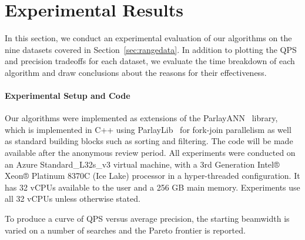 \section{Experimental Results}\label{sec:experiments}

In this section, we conduct an experimental evaluation of our algorithms on the nine datasets covered in Section~\ref{sec:rangedata}. In addition to plotting the QPS and precision tradeoffs for each dataset, we evaluate the time breakdown of each algorithm and draw conclusions about the reasons for their effectiveness. 

\paragraph{Experimental Setup and Code} Our algorithms were implemented as extensions of the ParlayANN~\cite{parlayann} library, which is implemented in C++ using ParlayLib~\cite{parlay} for fork-join parallelism as well as standard building blocks such as sorting and filtering. The code will be made available after the anonymous review period. All experiments were conducted on an Azure Standard\_L32s\_v3 virtual machine, with a 3rd Generation Intel® Xeon® Platinum 8370C (Ice Lake) processor in a hyper-threaded configuration. It has 32 vCPUs available to the user and a 256 GB main memory. Experiments use all 32 vCPUs unless otherwise stated.

To produce a curve of QPS versus average precision, the starting beamwidth is varied on a number of searches and the Pareto frontier is reported.

